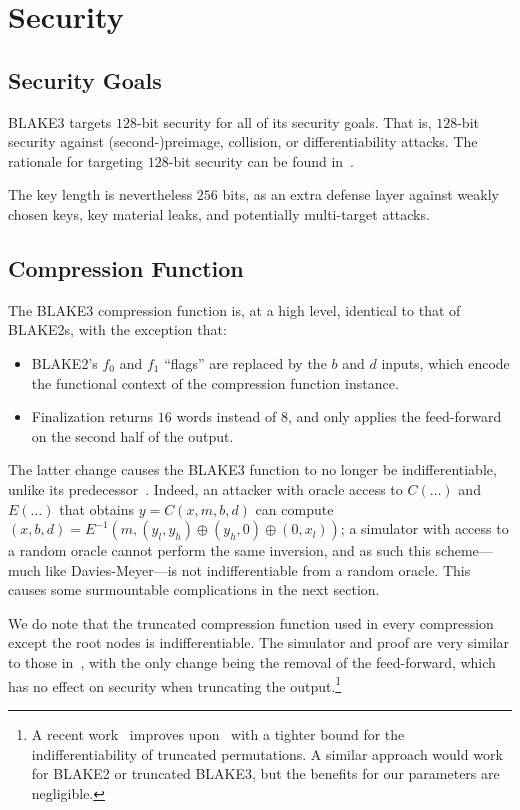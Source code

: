 \documentclass[11pt,notitlepage,a4paper]{article}
\begin{document}
\section{Security}\label{sec:security}

\subsection{Security Goals}\label{sec:goals}

BLAKE3 targets $128$-bit security for all of its security goals. That
is, $128$-bit security against (second-)preimage, collision, or
differentiability attacks. 
The rationale for targeting $128$-bit security can be found
in~\cite[\S2]{TMC}.

The key length is nevertheless $256$ bits, as an extra defense layer
against weakly chosen keys, key material leaks, and potentially
multi-target attacks.


\subsection{Compression Function}\label{sec:compressindiff}

The BLAKE3 compression function is, at a high level, identical to that of BLAKE2s, with
the exception that:

\begin{itemize}
  \item BLAKE2's $f_0$ and $f_1$ ``flags'' are replaced by the $b$ and $d$ inputs, which
  encode the functional context of the compression function instance.
  \item Finalization returns $16$ words instead of $8$, and only applies the feed-forward on the second half of the output.
\end{itemize}

The latter change causes the BLAKE3 function to no longer be indifferentiable, unlike its predecessor~\cite{DBLP:journals/tosc/LuykxMN16}. Indeed, an attacker with oracle access to $C(\dots)$ and $E(\dots)$ that obtains $y = C(x, m, b, d)$ can compute $(x, b, d) = E^{-1}(m, (y_l, y_h) \oplus (y_h, 0) \oplus (0, x_l))$; a simulator with access to a random oracle cannot perform the same inversion, and as such this scheme---much like Davies-Meyer---is not indifferentiable from a random oracle. This causes some surmountable complications in the next section.

We do note that the truncated compression function used in every compression except the root nodes is indifferentiable. The simulator and proof are very similar to those in~\cite{DBLP:journals/tosc/LuykxMN16}, with the only change being the removal of the feed-forward, which has no effect on security when truncating the output.\footnote{A recent work~\cite{DBLP:conf/asiacrypt/ChoiLL19} improves upon~\cite{DBLP:conf/fse/DodisRRS09,DBLP:journals/tosc/LuykxMN16} with a tighter bound for the indifferentiability of truncated permutations. A similar approach would work for BLAKE2 or truncated BLAKE3, but the benefits for our parameters are negligible.}
\end{document}

